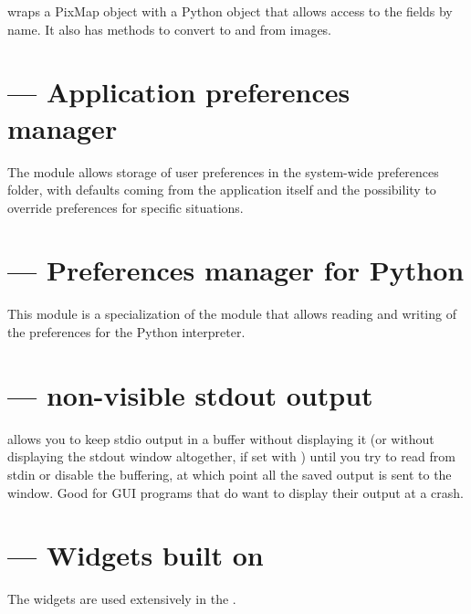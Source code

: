  wraps a PixMap object with a Python object that
allows access to the fields by name. It also has methods to convert
to and from  images.


\section{ --- Application preferences manager}

The  module allows storage of user preferences in
the system-wide preferences folder, with defaults coming from the
application itself and the possibility to override preferences for
specific situations.


\section{ --- Preferences manager for Python}

This module is a specialization of the  module
that allows reading and writing of the preferences for the Python
interpreter.


\section{ --- non-visible stdout output}

 allows you to keep stdio output in a buffer
without displaying it (or without displaying the stdout window
altogether, if set with ) until you try to read from
stdin or disable the buffering, at which point all the saved output is
sent to the window. Good for GUI programs that do want to display their
output at a crash.


\section{ --- Widgets built on }

The  widgets are used extensively in the .
